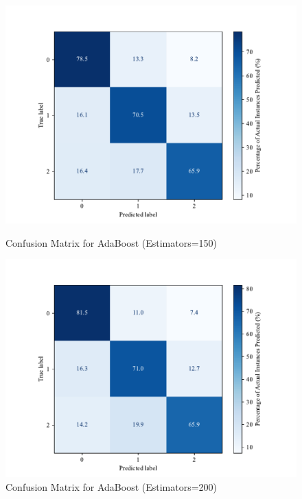         \begin{figure}[htbp]
        \centering
        \begin{minipage}[b]{0.45\textwidth}
        \centering
        \includegraphics[width=\textwidth]{images/confusion_matrix_adaboost150.pdf}
        \caption{Confusion Matrix for AdaBoost (Estimators=150)}
        \label{fig:confusion_adaboost_150}
        \end{minipage}
        \hfill
        \begin{minipage}[b]{0.45\textwidth}
        \centering
        \includegraphics[width=\textwidth]{images/confusion_matrix_adaboost200.pdf}
        \caption{Confusion Matrix for AdaBoost (Estimators=200)}
        \label{fig:confusion_adaboost_200}
        \end{minipage}
        \end{figure}



